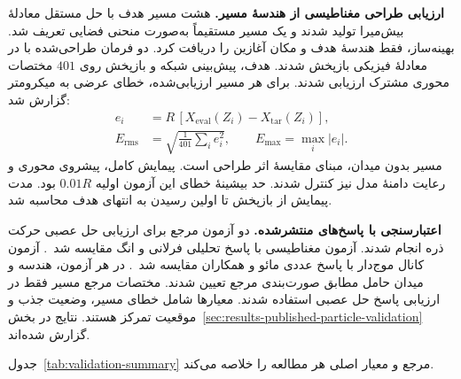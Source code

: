 \textbf{ارزیابی طراحی مغناطیسی از هندسهٔ مسیر.}
هشت مسیر هدف با حل مستقل معادلهٔ بیش‌میرا تولید شدند و یک مسیر مستقیماً به‌صورت منحنی فضایی تعریف شد.
بهینه‌ساز، فقط هندسهٔ هدف و مکان آغازین را دریافت کرد.
دو فرمان طراحی‌شده با  در معادلهٔ فیزیکی بازپخش شدند.
هدف، پیش‌بینی شبکه و بازپخش روی $401$ مختصات محوری مشترک ارزیابی شدند.
برای هر مسیر ارزیابی‌شده، خطای عرضی به میکرومتر گزارش شد:
\begin{equation}
\begin{aligned}
e_i&=R\,[X_{\mathrm{eval}}(Z_i)-X_{\mathrm{tar}}(Z_i)],\\
E_{\mathrm{rms}}&=\sqrt{\frac{1}{401}\sum_i e_i^2},\qquad
E_{\max}=\max_i |e_i|.
\end{aligned}
\label{eq:validation-master10-geometry}
\end{equation}
مسیر بدون میدان، مبنای مقایسهٔ اثر طراحی است.
پیمایش کامل، پیشروی محوری و رعایت دامنهٔ مدل نیز کنترل شدند.
حد بیشینهٔ خطای این آزمون اولیه $0.01R$ بود.
مدت پیمایش از بازپخش تا اولین رسیدن به انتهای هدف محاسبه شد.

\textbf{اعتبارسنجی با پاسخ‌های منتشرشده.}
دو آزمون مرجع برای ارزیابی حل عصبی حرکت ذره انجام شدند.
آزمون مغناطیسی با پاسخ تحلیلی فرلانی و انگ مقایسه شد~\cite{FurlaniNg2006Capture}.
آزمون کانال موج‌دار با پاسخ عددی مائو و همکاران مقایسه شد~\cite{MaoBischofbergerHosoi2023Wavy}.
در هر آزمون، هندسه و میدان حامل مطابق صورت‌بندی مرجع تعیین شدند.
مختصات مرجع مسیر فقط در ارزیابی پاسخ حل عصبی استفاده شدند.
معیارها شامل خطای مسیر، وضعیت جذب و موقعیت تمرکز هستند.
نتایج در بخش~\ref{sec:results-published-particle-validation} گزارش شده‌اند.

جدول~\ref{tab:validation-summary} مرجع و معیار اصلی هر مطالعه را خلاصه می‌کند.

